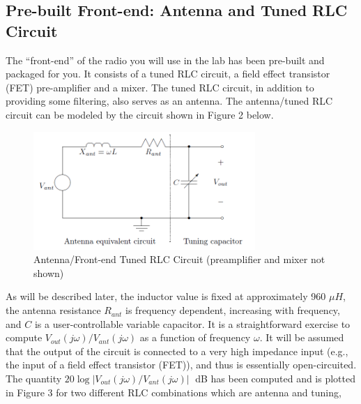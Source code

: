 \documentclass[utf8]{article}
\begin{document}
\subsection{Pre-built Front-end: Antenna and Tuned RLC Circuit}
{
	The “front-end” of the radio you will use in the lab has been pre-built and packaged for you. It consists of a tuned RLC circuit, a field effect transistor (FET) pre-amplifier and a mixer. The tuned RLC circuit, in addition to providing some filtering, also serves as an antenna. The antenna/tuned RLC circuit can be modeled by the circuit shown in Figure 2 below.

	\begin{figure}[H]
		\begin{small}
			\begin{center}
				\includegraphics[width=0.75\textwidth]{figures/Figure2.png}
			\end{center}
			\caption{Antenna/Front-end Tuned RLC Circuit (preamplifier and mixer not shown)}
			\label{fig:prebuilt}
		\end{small}
	\end{figure}

	As will be described later, the inductor value is fixed at approximately 960 $\mu H$, the antenna resistance $R_{ant}$ is frequency dependent, increasing with frequency, and $C$ is a user-controllable variable capacitor. It is a straightforward exercise to compute $V_{out}(j\omega)/V_{ant}(j\omega)$ as a function of frequency $\omega$. It will be assumed that the output of the circuit is connected to a very high impedance input (e.g., the input of a field effect transistor (FET)), and thus is essentially open-circuited. The quantity $20\log|V_{out}(j\omega)/V_{ant}(j\omega)|$  dB has been computed and is plotted in Figure 3 for two different RLC combinations which are antenna and tuning,

}
\end{document}
